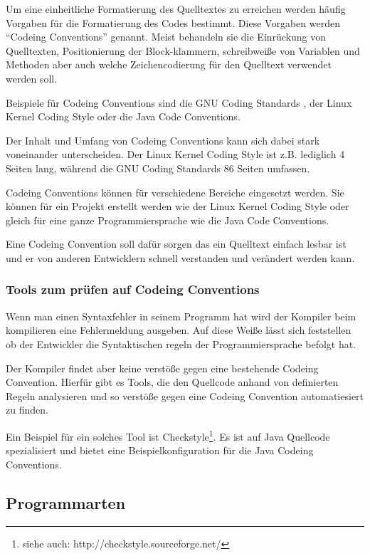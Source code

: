 Um eine einheitliche Formatierung des Quelltextes zu erreichen werden häufig
Vorgaben für die Formatierung des Codes bestimmt. Diese Vorgaben werden
\enquote{Codeing Conventions} genannt. Meist behandeln sie die Einrückung von Quelltexten,
Positionierung der Block-klammern, schreibweiße von Variablen und Methoden aber auch
welche Zeichencodierung für den Quelltext verwendet werden soll.

Beispiele für Codeing Conventions sind die GNU Coding Standards \cite{GNUCode},
der Linux Kernel Coding Style\cite{KernelCode} oder die Java Code Conventions\cite{javacode}.

Der Inhalt und Umfang von Codeing Conventions kann sich dabei stark voneinander
unterscheiden. Der Linux Kernel Coding Style ist z.B. lediglich 4 Seiten lang,
während die GNU Coding Standards 86 Seiten umfassen.

Codeing Conventions können für verschiedene Bereiche eingesetzt werden. Sie können für
ein Projekt erstellt werden wie der Linux Kernel Coding Style oder gleich für eine
ganze Programmiersprache wie die Java Code Conventions.

Eine Codeing Convention soll dafür sorgen das ein Quelltext einfach lesbar ist
und er von anderen Entwicklern schnell verstanden und verändert werden kann.

\subsubsection{Tools zum prüfen auf Codeing Conventions}

Wenn man einen Syntaxfehler in seinem Programm hat wird
der Kompiler beim kompilieren eine Fehlermeldung ausgeben.
Auf diese Weiße lässt sich feststellen ob der Entwickler
die Syntaktischen regeln der Programmiersprache befolgt hat.

Der Kompiler findet aber keine verstöße gegen eine bestehende Codeing Convention.
Hierfür gibt es Tools, die den Quellcode anhand von definierten Regeln analysieren
und so verstöße gegen eine Codeing Convention automatiesiert zu finden.

Ein Beispiel für ein solches Tool ist Checkstyle\footnote{siehe auch: http://checkstyle.sourceforge.net/}.
Es ist auf Java Quellcode spezialisiert und bietet eine Beispielkonfiguration für
die Java Codeing Conventions.

\subsection{Programmarten}


